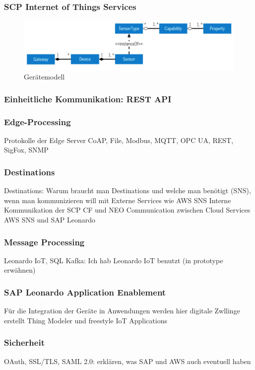 \subsubsection{SCP Internet of Things Services}

\begin{figure}[H]
  \centering
  \includegraphics[width=1.0\linewidth]{pictures/device_model}
  \caption[Gerätemodell]{Gerätemodell}
  \label{fig:filename_without_extension}
\end{figure}

\subsubsection{Einheitliche Kommunikation: REST API}

\subsubsection{Edge-Processing}

Protokolle der Edge Server CoAP, File, Modbus, MQTT, OPC UA, REST, SigFox, SNMP
\subsubsection{Destinations}
Destinations: Warum braucht man Destinations und welche man benötigt (SNS),  wenn man kommunizieren will mit
Externe Services wie AWS SNS
Interne Kommunikation der SCP CF und NEO
Communication zwischen Cloud Services AWS SNS und SAP Leonardo

\subsubsection{Message Processing}
Leonardo IoT, SQL Kafka: Ich hab Leonardo IoT benutzt (in prototype erwähnen)

\subsubsection{SAP Leonardo Application Enablement}
Für die Integration der Geräte in Anwendungen werden hier digitale Zwllinge erstellt
Thing Modeler und freestyle IoT Applications
\subsubsection{Sicherheit}
OAuth, SSL/TLS, SAML 2.0: erklären, was SAP und AWS auch eventuell haben

